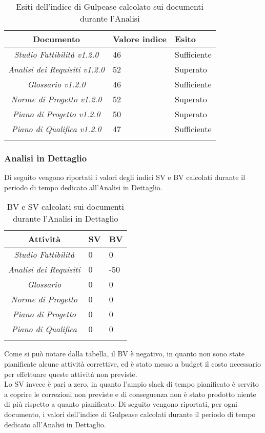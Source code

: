 \begin{longtable}{|c|p{3cm}|p{3cm}|}
\toprule
\textbf{Documento} & \textbf{Valore indice} & \textbf{Esito} \\


\midrule
\emph{Studio Fattibilità v1.2.0} & 46 & Sufficiente\\
\midrule
\emph{Analisi dei Requisiti v1.2.0} & 52& Superato\\
\midrule
\emph{Glossario v1.2.0} & 46 & Sufficiente\\
\midrule
\emph{Norme di Progetto v1.2.0} & 52 & Superato\\
\midrule
\emph{Piano di Progetto v1.2.0} & 50 & Superato\\
\midrule
\emph{Piano di Qualifica v1.2.0} & 47 & Sufficiente\\
\bottomrule
\caption{Esiti dell'indice di Gulpease calcolato sui documenti durante l'Analisi}
\label{tab:changelog}
\end{longtable}
\subsubsection{Analisi in Dettaglio}
Di seguito vengono riportati i valori degli indici SV e BV calcolati durante il periodo di tempo dedicato all'Analisi in Dettaglio.
\begin{longtable}{|c|p{3cm}|p{3cm}|}
\toprule
\textbf{Attività} & \textbf{SV} & \textbf{BV} \\


\midrule
\emph{Studio Fattibilità} & 0 & 0 \\
\midrule
\emph{Analisi dei Requisiti} & 0 & -50\\
\midrule
\emph{Glossario} & 0  & 0\\
\midrule
\emph{Norme di Progetto} & 0 & 0\\
\midrule
\emph{Piano di Progetto} & 0 & 0\\
\midrule
\emph{Piano di Qualifica} & 0 & 0\\
\bottomrule
\caption{BV e SV calcolati sui documenti durante l'Analisi in Dettaglio}
\label{tab:changelog}
\end{longtable}
Come si può notare dalla tabella, il BV è negativo, in quanto non sono state pianificate alcune attività correttive, ed è stato messo a budget il costo necessario per effettuare queste attività non previste.\\
Lo SV invece è pari a zero, in quanto l'ampio slack di tempo pianificato è servito a coprire le correzioni non previste e di conseguenza non è stato prodotto niente di più rispetto a quanto pianificato. 
Di seguito vengono riportati, per ogni documento, i valori dell'indice di Gulpease calcolati durante il periodo di tempo dedicato all'Analisi in Dettaglio.

